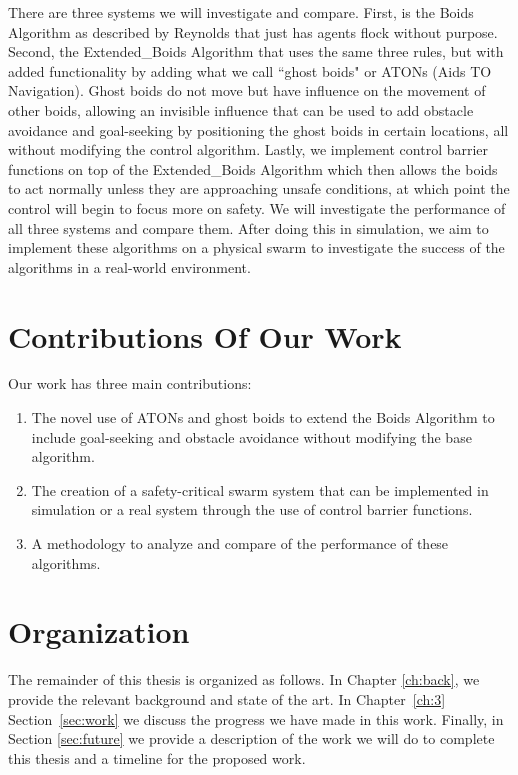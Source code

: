 There are three systems we will investigate and compare. First, is the Boids Algorithm as described by Reynolds \cite{reynolds1987flocks} that just has agents flock without purpose. Second, the Extended\_Boids Algorithm that uses the same three rules, but with added functionality by adding what we call ``ghost boids" or ATONs (Aids TO Navigation). Ghost boids do not move but have influence on the movement of other boids, allowing an invisible influence that can be used to add obstacle avoidance and goal-seeking by positioning the ghost boids in certain locations, all without modifying the control algorithm. Lastly, we implement control barrier functions on top of the Extended\_Boids Algorithm which then allows the boids to act normally unless they are approaching unsafe conditions, at which point the control will begin to focus more on safety. We will investigate the performance of all three systems and compare them. After doing this in simulation, we aim to implement these algorithms on a physical swarm to investigate the success of the algorithms in a real-world environment.

\section{Contributions Of Our Work}

Our work has three main contributions:
\begin{enumerate}
    \item The novel use of ATONs and ghost boids to extend the Boids Algorithm to include goal-seeking and obstacle avoidance without modifying the base algorithm.
    \item The creation of a safety-critical swarm system that can be implemented in simulation or a real system through the use of control barrier functions.
    \item A methodology to analyze and compare of the performance of these algorithms.
\end{enumerate}

\section{Organization}

The remainder of this thesis is organized as follows. In Chapter \ref{ch:back}, we provide the relevant background and state of the art. In Chapter~\ref{ch:3} Section~\ref{sec:work}  we discuss the progress we have made in this work. Finally, in Section \ref{sec:future} we provide a description of the work we will do to complete this thesis and a timeline for the proposed work.